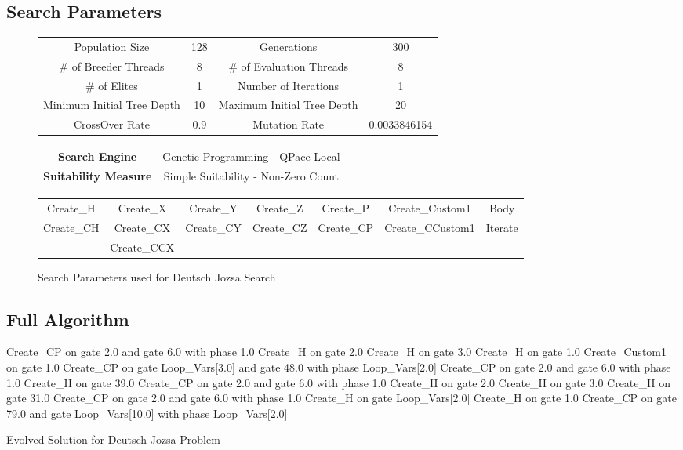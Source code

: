\clearpage
\subsection{Search Parameters}
\label{sec:deutschjozsasearchparams}

\begin{figure}[h!]
\begin{center}
 \begin{tabular}{|cc|cc|}
\hline
  Population Size & 128 & Generations & 300 \\
  \# of Breeder Threads & 8 & \# of Evaluation Threads & 8 \\
  \# of Elites & 1 & Number of Iterations & 1 \\
  Minimum Initial Tree Depth & 10 & Maximum Initial Tree Depth & 20 \\
  CrossOver Rate & 0.9 & Mutation Rate & 0.0033846154 \\
\hline
 \end{tabular}
 \begin{tabular}{cc}
  \textbf{Search Engine} & Genetic Programming - QPace Local \\
  \textbf{Suitability Measure} & Simple Suitability - Non-Zero Count \\
 \end{tabular}
\begin{tabular}{|ccccccc|}
\hline
  Create\_H & Create\_X& Create\_Y& Create\_Z & Create\_P & Create\_Custom1 & Body \\
  Create\_CH & Create\_CX & Create\_CY & Create\_CZ & Create\_CP & Create\_CCustom1 & Iterate \\
   & Create\_CCX &  & &  &  &  \\
\hline
 \end{tabular}
\end{center}
\caption{Search Parameters used for Deutsch Jozsa Search}
\label{fig:deutschjozsaparams}
\end{figure}

\subsection{Full Algorithm}
\label{sec:DeutschJozsaExpAppFullAlg}

\begin{algorithm}
 \begin{algorithmic}
\STATE Create\_CP on gate 2.0 and gate 6.0 with phase 1.0
\STATE Create\_H on gate 2.0
\STATE Create\_H on gate 3.0
\STATE Create\_H on gate 1.0
\STATE Create\_Custom1 on gate 1.0
\STATE Create\_CP on gate Loop\_Vars[3.0] and gate 48.0 with phase Loop\_Vars[2.0]
\STATE Create\_CP on gate 2.0 and gate 6.0 with phase 1.0
\STATE Create\_H on gate 39.0
\STATE Create\_CP on gate 2.0 and gate 6.0 with phase 1.0
\STATE Create\_H on gate 2.0
\STATE Create\_H on gate 3.0
\STATE Create\_H on gate 31.0
\STATE Create\_CP on gate 2.0 and gate 6.0 with phase 1.0
\STATE Create\_H on gate Loop\_Vars[2.0]
\STATE Create\_H on gate 1.0
\STATE Create\_CP on gate 79.0 and gate Loop\_Vars[10.0] with phase Loop\_Vars[2.0]
 \end{algorithmic}
\caption{Evolved Solution for Deutsch Jozsa Problem}
\label{alg:evodeutschjozsa}
\end{algorithm}

